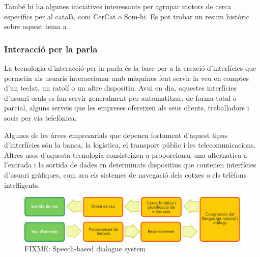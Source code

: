 \documentclass[]{../../metanetpaper}
\begin{document}
\begin{multicols}{2}
També hi ha algunes iniciatives interessants per agrupar motors de cerca específics per al català, com CerCat o Som-hi\cite{CAT-cercadors}. Es pot trobar un resum històric sobre aquest tema a \cite{CAT-Resum-sobre-cercadors}.
  
\subsubsection{Interacció per la parla}

La tecnologia d’interacció per la parla és la base per a la creació d’interfícies que permetin als usuaris interaccionar amb màquines fent servir la veu en comptes d’un teclat, un ratolí o un altre dispositiu. Avui en dia, aquestes interfícies d’usuari orals es fan servir generalment per automatitzar, de forma total o parcial, alguns serveis que les empreses ofereixen als seus clients, treballadors i socis per via telefònica.

Algunes de les àrees empresarials que depenen fortament d’aquest tipus d’interfícies són la banca, la logística, el transport públic i les telecomunicacions. Altres usos d’aquesta tecnologia consisteixen a proporcionar una alternativa a l’entrada i la sortida de dades en determinats dispositius que contenen interfícies d’usuari gràfiques, com ara els sistemes de navegació dels cotxes o els telèfons inteŀligents. 

\begin{figure}[htb]
  \vspace{-9mm}
  \center  \includegraphics[width=\textwidth]{../_media/catalan/simple_speech-based_dialogue_architecture}
  \center
  \caption{FIXME: Speech-based dialogue system}
  \label{fig:dialoguearch_ca}
\end{figure}


\end{multicols}
\end{document}
